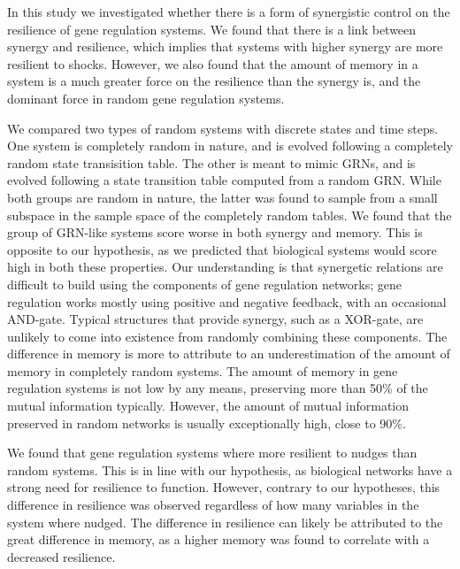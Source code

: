 \documentclass[../main.tex]{subfiles}
\begin{document}
In this study we investigated whether there is a form of synergistic control on the resilience of gene regulation systems.
We found that there is a link between synergy and resilience, which implies that systems with higher synergy are more resilient to shocks.
However, we also found that the amount of memory in a system is a much greater force on the resilience than the synergy is, and the dominant force in random gene regulation systems.

We compared two types of random systems with discrete states and time steps.
One system is completely random in nature, and is evolved following a completely random state transisition table.
The other is meant to mimic GRNs, and is evolved following a state transition table computed from a random GRN.
While both groups are random in nature, the latter was found to sample from a small subspace in the sample space of the completely random tables.
We found that the group of GRN-like systems score worse in both synergy and memory.
This is opposite to our hypothesis, as we predicted that biological systems would score high in both these properties.
Our understanding is that synergetic relations are difficult to build using the components of gene regulation networks; gene regulation works mostly using positive and negative feedback, with an occasional AND-gate.
Typical structures that provide synergy, such as a XOR-gate, are unlikely to come into existence from randomly combining these components.
The difference in memory is more to attribute to an underestimation of the amount of memory in completely random systems.
The amount of memory in gene regulation systems is not low by any means, preserving more than 50\% of the mutual information typically.
However, the amount of mutual information preserved in random networks is usually exceptionally high, close to 90\%.

We found that gene regulation systems where more resilient to nudges than random systems.
This is in line with our hypothesis, as biological networks have a strong need for resilience to function.
However, contrary to our hypotheses, this difference in resilience was observed regardless of how many variables in the system where nudged.
The difference in resilience can likely be attributed to the great difference in memory, as a higher memory was found to correlate with a decreased resilience.
\end{document}
